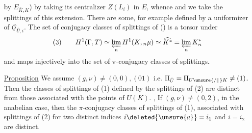 by $E_{\bar K,K}$) by taking its centralizer $Z(L_i)$ in $E$, whence
and we take the splittings of this extension. There are some, for example defined by a uniformizer of $\underline{\mathcal O}_{\widehat U,i}$. The set of conjugacy classes of  splittings  of () is a torsor under 
\[
(3)\qquad H^1(\Gamma,T)\simeq\varprojlim_n H^1(K,{}_n\mu)\simeq\widehat{K^*}=\varprojlim_n K^*_n
\]
and  maps injectively  into the set of $\pi$-conjugacy classes of splittings.

\uline{Proposition} We assume $(g,\nu)\ne(0,0),(01)$ i.e. $\Pi_{\bar U}=\Pi_{U\unsure{/|\mid}K}\ne(1)$. Then the  classes of splittings  of (1) defined by the splittings of (2) are distinct from those associated with the points of $U(K)$. , If  $(g,\nu)\ne(0,2)$,   in the anabelian case, then the $\pi$-conjugacy classes of splittings of (1), associated with splittings of (2) for two distinct indices $i\deleted{\unsure{a}}=i_1$ and $i=i_2$\unsure{,} are distinct.
